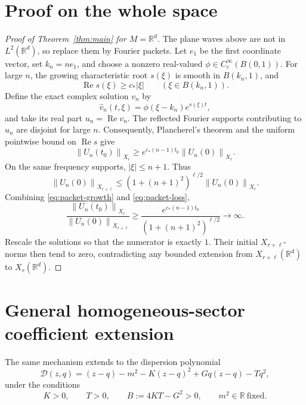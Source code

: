\documentclass[11pt]{article}
\newcommand{\RR}{\mathbb{R}}
\newcommand{\norm}[1]{\left\lVert #1\right\rVert}
\begin{document}
\section{Proof on the whole space}

\begin{proof}[Proof of Theorem~\ref{thm:main} for \(M=\RR^d\)]
The plane waves above are not in \(L^2(\RR^d)\), so replace them by Fourier packets. Let \(e_1\) be the first coordinate vector, set \(k_n=ne_1\), and choose a nonzero real-valued \(\phi\in C_c^\infty(B(0,1))\). For large \(n\), the growing characteristic root \(s(\xi)\) is smooth in \(B(k_n,1)\), and
\[
  \operatorname{Re}s(\xi)\ge c_*|\xi|
  \qquad (\xi\in B(k_n,1)).
\]
Define the exact complex solution \(v_n\) by
\[
  \widehat v_n(t,\xi)=\phi(\xi-k_n)e^{s(\xi)t},
\]
and take its real part \(u_n=\operatorname{Re}v_n\). The reflected Fourier supports contributing to \(u_n\) are disjoint for large \(n\). Consequently, Plancherel's theorem and the uniform pointwise bound on \(\operatorname{Re}s\) give
\begin{equation}\label{eq:packet-growth}
  \norm{U_n(t_0)}_{X_r}
  \ge e^{c_*(n-1)t_0}\norm{U_n(0)}_{X_r}.
\end{equation}
On the same frequency supports, \(|\xi|\le n+1\). Thus
\begin{equation}\label{eq:packet-loss}
  \norm{U_n(0)}_{X_{r+\ell}}
    \le (1+(n+1)^2)^{\ell/2}\norm{U_n(0)}_{X_r}.
\end{equation}
Combining \eqref{eq:packet-growth} and \eqref{eq:packet-loss},
\[
  \frac{\norm{U_n(t_0)}_{X_r}}
       {\norm{U_n(0)}_{X_{r+\ell}}}
  \ge\frac{e^{c_*(n-1)t_0}}{(1+(n+1)^2)^{\ell/2}}
  \longrightarrow\infty.
\]
Rescale the solutions so that the numerator is exactly \(1\). Their initial \(X_{r+\ell}\)-norms then tend to zero, contradicting any bounded extension from \(X_{r+\ell}(\RR^d)\) to \(X_r(\RR^d)\).
\end{proof}

\section{General homogeneous-sector coefficient extension}

The same mechanism extends to the dispersion polynomial
\begin{equation}\label{eq:general-D}
  \mathcal D(z,q)=(z-q)-m^2-K(z-q)^2
                       +Gq(z-q)-Tq^2,
\end{equation}
under the conditions
\begin{equation}\label{eq:general-hypotheses}
  K>0,\qquad T>0,\qquad B:=4KT-G^2>0,
  \qquad m^2\in\RR\ \text{fixed}.
\end{equation}
\end{document}
